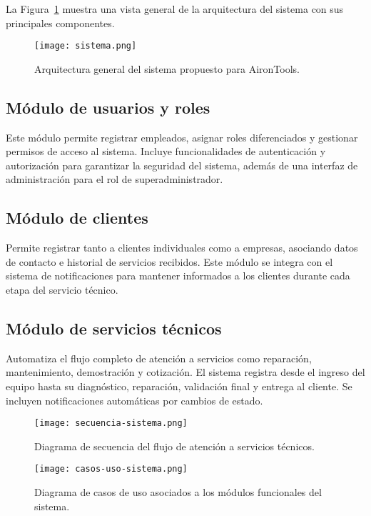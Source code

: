 La Figura~\ref{fig:arquitectura} muestra una vista general de la arquitectura del sistema con sus principales componentes.

\begin{figure}[H]
	\centering
	\texttt{[image: sistema.png]}
	\caption{Arquitectura general del sistema propuesto para AironTools.}
	\label{fig:arquitectura}
\end{figure}

\subsection*{Módulo de usuarios y roles}

Este módulo permite registrar empleados, asignar roles diferenciados y gestionar permisos de acceso al sistema. Incluye funcionalidades de autenticación y autorización para garantizar la seguridad del sistema, además de una interfaz de administración para el rol de superadministrador.

\subsection*{Módulo de clientes}

Permite registrar tanto a clientes individuales como a empresas, asociando datos de contacto e historial de servicios recibidos. Este módulo se integra con el sistema de notificaciones para mantener informados a los clientes durante cada etapa del servicio técnico.

\subsection*{Módulo de servicios técnicos}

Automatiza el flujo completo de atención a servicios como reparación, mantenimiento, demostración y cotización. El sistema registra desde el ingreso del equipo hasta su diagnóstico, reparación, validación final y entrega al cliente. Se incluyen notificaciones automáticas por cambios de estado.

\begin{figure}[H]
	\centering
	\texttt{[image: secuencia-sistema.png]}
	\caption{Diagrama de secuencia del flujo de atención a servicios técnicos.}
	\label{fig:secuencia}
\end{figure}

\begin{figure}[H]
	\centering
	\texttt{[image: casos-uso-sistema.png]}
	\caption{Diagrama de casos de uso asociados a los módulos funcionales del sistema.}
	\label{fig:casosuso}
\end{figure}

